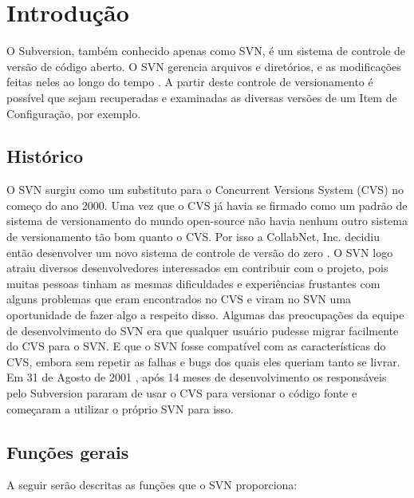 \chapter[Introdução]{Introdução}

  O Subversion, também conhecido apenas como SVN, é um sistema de controle de versão de código aberto. O SVN gerencia arquivos e diretórios, e as modificações feitas neles ao longo do tempo \cite{svn-book}.
  A partir deste controle de versionamento é possível que sejam recuperadas e examinadas as diversas versões de um Item de Configuração, por exemplo.

\section{Histórico}

  O SVN surgiu como um substituto para o Concurrent Versions System (CVS) \cite{cvs-book} no começo do ano 2000. Uma vez que o CVS já havia se firmado como um padrão de sistema de versionamento do mundo open-source não havia nenhum outro sistema de versionamento tão bom quanto o CVS. Por isso a CollabNet, Inc. decidiu então desenvolver um novo sistema de controle de versão do zero \cite{svn-book}.
  O SVN logo atraiu diversos desenvolvedores interessados em contribuir com o projeto, pois muitas pessoas tinham as mesmas dificuldades e experiências frustantes com alguns problemas que eram encontrados no CVS e viram no SVN uma oportunidade de fazer algo a respeito disso.
  Algumas das preocupações da equipe de desenvolvimento do SVN era que qualquer usuário pudesse migrar facilmente do CVS para o SVN. E que o SVN fosse compatível com as características do CVS, embora sem repetir as falhas e bugs dos quais eles queriam tanto se livrar.
  Em 31 de Agosto de 2001 \cite{svn-book}, após 14 meses de desenvolvimento os responsáveis pelo Subversion pararam de usar o CVS para versionar o código fonte e começaram a utilizar o próprio SVN para isso.

\section{Funções gerais}

  A seguir serão descritas as funções que o SVN proporciona:

